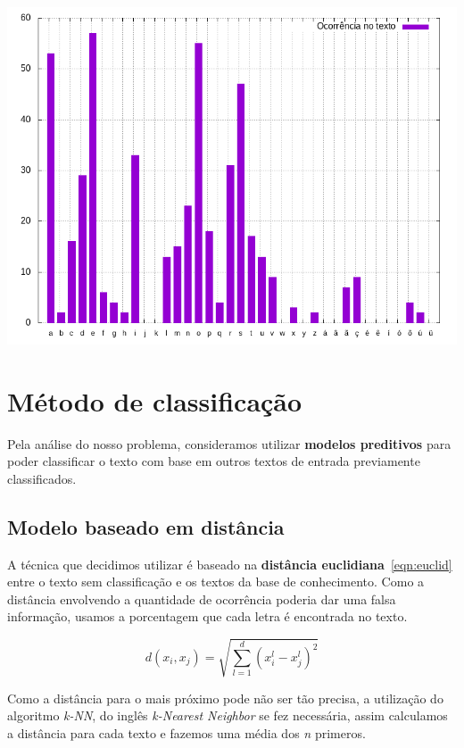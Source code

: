 \documentclass[a0,portrait]{a0poster}
\begin{document}
\begin{multicols}{2}
\begin{center}\vspace{1cm}
    \includegraphics[width=0.8\linewidth]{freq-ptbr.png}
\end{center}\vspace{1cm}

\section*{Método de classificação}
Pela análise do nosso problema, consideramos utilizar \textbf{modelos preditivos} para poder classificar o texto com base em outros textos de entrada previamente classificados.

\subsection*{Modelo baseado em distância}
A técnica que decidimos utilizar é baseado na \textbf{distância euclidiana}~\ref{eqn:euclid} entre o texto sem classificação e os textos da base de conhecimento. Como a distância envolvendo a quantidade de ocorrência poderia dar uma falsa informação, usamos a porcentagem que cada letra é encontrada no texto.

\vspace{0.5cm}
\begin{equation}
d(x_i, x_j) = \sqrt{\sum_{l=1}^{d} (x^l_i - x^l_j)^2}
\label{eqn:euclid}
\end{equation}\vspace{0.5cm}

Como a distância para o mais próximo pode não ser tão precisa, a utilização do algoritmo \emph{k-NN}, do inglês \emph{k-Nearest Neighbor} se fez necessária, assim calculamos a distância para cada texto e fazemos uma média dos \emph{n} primeros.


\end{multicols}
\end{document}
